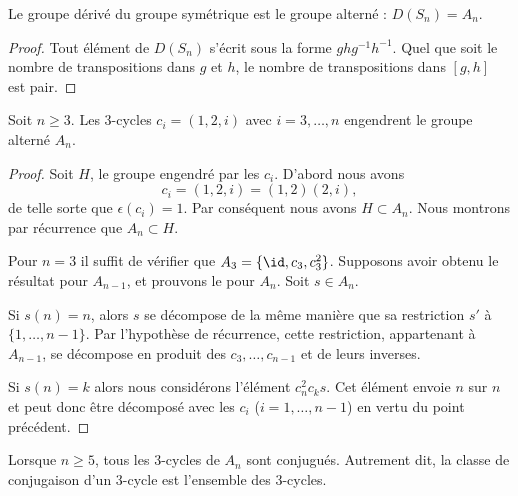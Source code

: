 \begin{lemma}   \label{LemiApyfp}   
	Le groupe dérivé du groupe symétrique est le groupe alterné : \( D(S_n)=A_n\).
\end{lemma}

\begin{proof}
	Tout élément de \( D(S_n)\) s'écrit sous la forme \( ghg^{-1}h^{-1}\). Quel que soit le nombre de transpositions dans \( g\) et \( h\), le nombre de transpositions dans \( [g,h]\) est pair.
\end{proof}

\begin{proposition}     \label{PropsHlmvv}
	Soit \( n\geq 3\). Les \( 3\)-cycles \( c_i=(1,2,i)\) avec \( i=3,\ldots, n\) engendrent le groupe alterné \( A_n\).
\end{proposition}

\begin{proof}
	Soit \( H\), le groupe engendré par les \( c_i\). D'abord nous avons
	\begin{equation}
		c_i=(1,2,i)=(1,2)(2,i),
	\end{equation}
	de telle sorte que \( \epsilon(c_i)=1\). Par conséquent nous avons \( H\subset A_n\). Nous montrons par récurrence que \( A_n\subset H\).

	Pour \( n=3\) il suffit de vérifier que \( A_3=\{ \id,c_3,c_3^2 \}\). Supposons avoir obtenu le résultat pour \(A_{n-1}\), et prouvons le pour \( A_n\). Soit \( s\in A_n\).

	Si \( s(n)=n\), alors \( s\) se décompose de la même manière que sa restriction \( s'\) à \( \{ 1,\ldots, n-1 \}\). Par l'hypothèse de récurrence, cette restriction, appartenant à \( A_{n-1}\),  se décompose en produit des \( c_3,\ldots, c_{n-1}\) et de leurs inverses.

	Si \( s(n)=k\) alors nous considérons l'élément \( c^2_nc_ks\). Cet élément envoie \( n\) sur \( n\) et peut donc être décomposé avec les \( c_i\) (\( i=1,\ldots, n-1\)) en vertu du point précédent.
\end{proof}

\begin{proposition} \label{PropiodtBG}
	Lorsque \( n\geq 5\), tous les \( 3\)-cycles de \( A_n\) sont conjugués. Autrement dit, la classe de conjugaison d'un \( 3\)-cycle est l'ensemble des \( 3\)-cycles.
\end{proposition}

